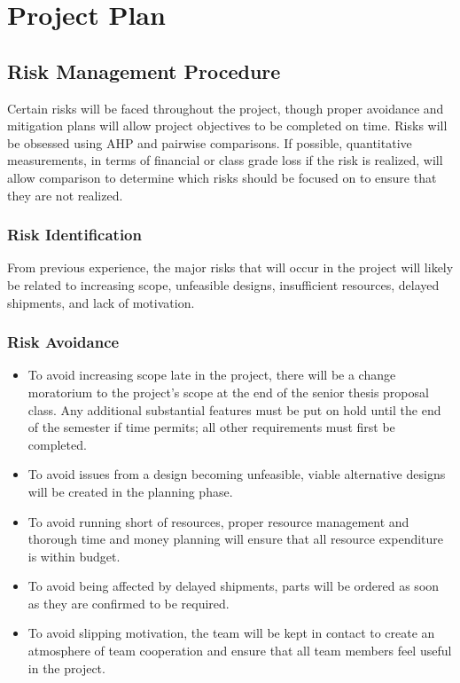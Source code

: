 \chapter{Project Plan}
\section{Risk Management Procedure}
Certain risks will be faced throughout the project, though proper avoidance and mitigation plans will allow project objectives to be completed on time.
Risks will be obsessed using AHP and pairwise comparisons.
If possible, quantitative measurements, in terms of financial or class grade loss if the risk is realized, will allow comparison to determine which risks should be focused on to ensure that they are not realized.

\subsection{Risk Identification}
From previous experience, the major risks that will occur in the project will likely be related to increasing scope, unfeasible designs, insufficient resources, delayed shipments, and lack of motivation.

\subsection{Risk Avoidance}
\begin{itemize} \parskip2pt
	\item To avoid increasing scope late in the project, there will be a change moratorium to the project’s scope at the end of the senior thesis proposal class. Any additional substantial features must be put on hold until the end of the semester if time permits; all other requirements must first be completed.
	\item To avoid issues from a design becoming unfeasible, viable alternative designs will be created in the planning phase.
	\item To avoid running short of resources, proper resource management and thorough time and money planning will ensure that all resource expenditure is within budget.
	\item To avoid being affected by delayed shipments, parts will be ordered as soon as they are confirmed to be required.
	\item To avoid slipping motivation, the team will be kept in contact to create an atmosphere of team cooperation and ensure that all team members feel useful in the project.
\end{itemize}	

